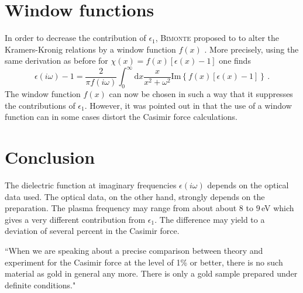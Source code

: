\documentclass[twocolumn,superscriptaddress,pre]{revtex4-1}
\begin{document}
\section{Window functions}

In order to decrease the contribution of $\epsilon_1$,
\textsc{Bimonte} proposed to \cite{Bimonte2010}
to alter the Kramers-Kronig relations by a window function $f(x)$ \cite{Bimonte2010}. More precisely,
using the same derivation as before for $\chi(x)=f(x)[\epsilon(x)-1]$ one finds
\begin{equation}
\epsilon(i\omega)-1 = \frac{2}{\pi f(i\omega)} \int_0^\infty \mathrm{d}x \frac{x}{x^2+\omega^2} \mathrm{Im}\left\{ f(x)\left[\epsilon(x)-1\right] \right\} \,.
\end{equation}
The window function $f(x)$ can now be chosen in such a way that it suppresses
the contributions of $\epsilon_1$. However, it was pointed out in \cite{Shpak2011}
that the use of a window function can in some cases distort the Casimir force
calculations.

\section{Conclusion}

The dielectric function at imaginary frequencies $\epsilon(i\omega)$ depends on
the optical data used. The optical data, on the other hand, strongly depends on
the preparation. The plasma frequency may range from about about 8 to $9\,$eV
which gives a very different contribution from $\epsilon_1$. The difference may yield
to a deviation of several percent in the Casimir force.

``When we are speaking about a precise comparison between theory and experiment for the Casimir
force at the level of 1\% or better, there is no such material as gold in general any more.
There is only a gold sample prepared under definite conditions." \cite{Pirozhenko2006}
\end{document}
